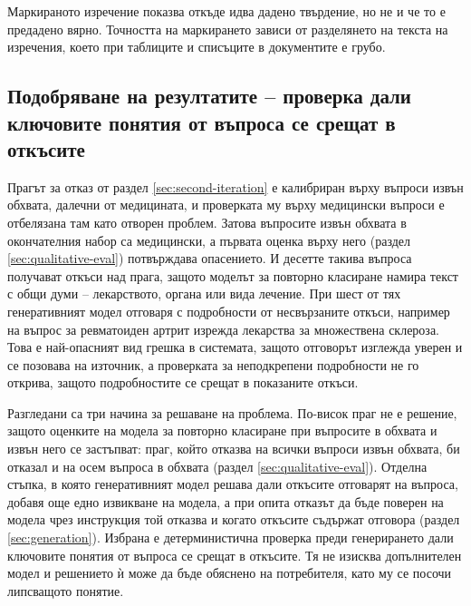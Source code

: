 \documentclass[12pt,a4paper]{article}
\makeatletter
\renewcommand\paragraph{\@startsection{paragraph}{4}{\z@}{1.5ex \@plus .5ex \@minus .2ex}{-1em}{\normalfont\normalsize\bfseries}}
\makeatother
\begin{document}
\paragraph{Ограничения.} Маркираното изречение показва откъде идва дадено твърдение, но не и че то е предадено вярно. Точността на маркирането зависи от разделянето на текста на изречения, което при таблиците и списъците в документите е грубо.

\subsection{Подобряване на резултатите -- проверка дали ключовите понятия от въпроса се срещат в откъсите}
\label{sec:coverage}
Прагът за отказ от раздел \ref{sec:second-iteration} е калибриран върху въпроси извън обхвата, далечни от медицината, и проверката му върху медицински въпроси е отбелязана там като отворен проблем. Затова въпросите извън обхвата в окончателния набор са медицински, а първата оценка върху него (раздел \ref{sec:qualitative-eval}) потвърждава опасението. И десетте такива въпроса получават откъси над прага, защото моделът за повторно класиране намира текст с общи думи -- лекарството, органа или вида лечение. При шест от тях генеративният модел отговаря с подробности от несвързаните откъси, например на въпрос за ревматоиден артрит изрежда лекарства за множествена склероза. Това е най-опасният вид грешка в системата, защото отговорът изглежда уверен и се позовава на източник, а проверката за неподкрепени подробности не го открива, защото подробностите се срещат в показаните откъси.

Разгледани са три начина за решаване на проблема. По-висок праг не е решение, защото оценките на модела за повторно класиране при въпросите в обхвата и извън него се застъпват: праг, който отказва на всички въпроси извън обхвата, би отказал и на осем въпроса в обхвата (раздел \ref{sec:qualitative-eval}). Отделна стъпка, в която генеративният модел решава дали откъсите отговарят на въпроса, добавя още едно извикване на модела, а при опита отказът да бъде поверен на модела чрез инструкция той отказва и когато откъсите съдържат отговора (раздел \ref{sec:generation}). Избрана е детерминистична проверка преди генерирането дали ключовите понятия от въпроса се срещат в откъсите. Тя не изисква допълнителен модел и решението ѝ може да бъде обяснено на потребителя, като му се посочи липсващото понятие.
\end{document}
